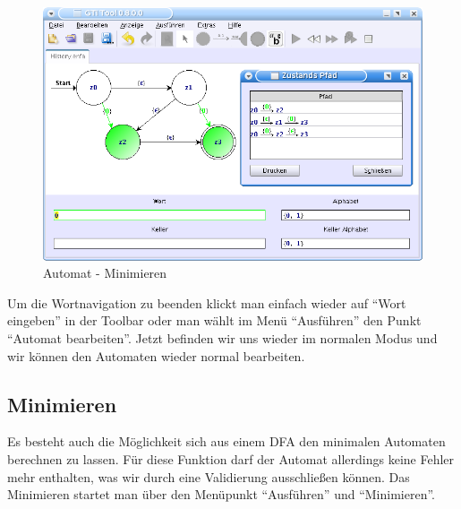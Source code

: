     \begin{figure}[h]
  \begin{center}
  \includegraphics[width=12cm]{images/history_path.png}
  \caption{Automat - Minimieren}
  \end{center}
  \end{figure}
  
  Um die Wortnavigation zu beenden klickt man einfach wieder auf "`Wort
  eingeben"' in der Toolbar oder man wählt im Menü "`Ausführen"' den Punkt
  "`Automat bearbeiten"'. Jetzt befinden wir uns wieder im normalen Modus und wir
  können den Automaten wieder normal bearbeiten.
   
\subsection{Minimieren}
  
  Es besteht auch die Möglichkeit sich aus einem DFA den minimalen Automaten
  berechnen zu lassen. Für diese Funktion darf der Automat allerdings keine
  Fehler mehr enthalten, was wir durch eine Validierung ausschließen können. Das
  Minimieren startet man über den Menüpunkt "`Ausführen"' und
  "`Minimieren"'.\vspace{10pt}
  
